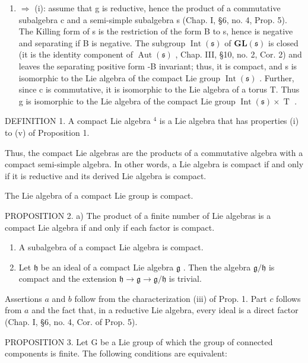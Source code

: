 \begin{enumerate}
\item
  \(\Longrightarrow\) (i): assume that g is reductive, hence the product of a commutative subalgebra c and a semi-simple subalgebra s (Chap. I, §6, no. 4, Prop. 5). The Killing form of s is the restriction of the form B to s, hence is negative and separating if B is negative. The subgroup \(\operatorname{Int}(\mathfrak{s})\) of \(\mathbf{GL}(\mathfrak{s})\) is closed (it is the identity component of \(\operatorname{Aut}(\mathfrak{s})\) , Chap. III, §10, no. 2, Cor. 2) and leaves the separating positive form -B invariant; thus, it is compact, and s is isomorphic to the Lie algebra of the compact Lie group \(\operatorname{Int}(\mathfrak{s})\) . Further, since c is commutative, it is isomorphic to the Lie algebra of a torus T. Thus g is isomorphic to the Lie algebra of the compact Lie group \(\operatorname{Int}(\mathfrak{s}) \times \operatorname{T}\) .
\end{enumerate}

DEFINITION 1. A compact Lie algebra \(^{4}\) is a Lie algebra that has properties (i) to (v) of Proposition 1.

Thus, the compact Lie algebras are the products of a commutative algebra with a compact semi-simple algebra. In other words, a Lie algebra is compact if and only if it is reductive and its derived Lie algebra is compact.

The Lie algebra of a compact Lie group is compact.

PROPOSITION 2. a) The product of a finite number of Lie algebras is a compact Lie algebra if and only if each factor is compact.

\begin{enumerate}
\def\labelenumi{\alph{enumi})}
\setcounter{enumi}{1}
\item
  A subalgebra of a compact Lie algebra is compact.
\item
  Let \(\mathfrak{h}\) be an ideal of a compact Lie algebra \(\mathfrak{g}\) . Then the algebra \(\mathfrak{g} / \mathfrak{h}\) is compact and the extension \(\mathfrak{h} \to \mathfrak{g} \to \mathfrak{g} / \mathfrak{h}\) is trivial.
\end{enumerate}

Assertions \(a\) and \(b\) follow from the characterization (iii) of Prop. 1. Part \(c\) follows from \(a\) and the fact that, in a reductive Lie algebra, every ideal is a direct factor (Chap. I, §6, no. 4, Cor. of Prop. 5).

PROPOSITION 3. Let G be a Lie group of which the group of connected components is finite. The following conditions are equivalent:

